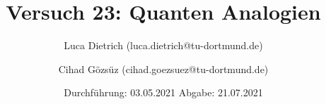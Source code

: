 

\subject{Fortgeschrittenenpraktikum der Fakultät Physik}
\title{Versuch 23: Quanten Analogien}
\author{Luca Dietrich (luca.dietrich@tu-dortmund.de) \and Cihad Gözsüz (cihad.goezsuez@tu-dortmund.de)}
\date{
  Durchführung: 03.05.2021
  \hspace{3em}
  Abgabe: 21.07.2021
}
\publishers{TU Dortmund – Fakultät Physik}



\maketitle
\thispagestyle{empty}
\tableofcontents
\newpage






\newpage
\printbibliography{}

